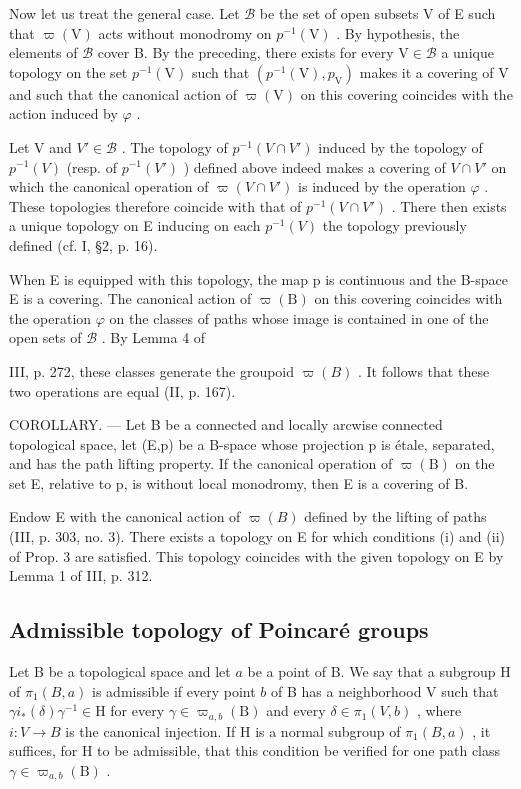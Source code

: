 Now let us treat the general case. Let \(\mathcal{B}\) be the set of open subsets V of E such that \(\varpi(\mathrm{V})\) acts without monodromy on \(p^{-1}(\mathrm{V})\) . By hypothesis, the elements of \(\mathcal{B}\) cover B. By the preceding, there exists for every \(\mathrm{V} \in \mathcal{B}\) a unique topology on the set \(p^{-1}(\mathrm{V})\) such that \((p^{-1}(\mathrm{V}), p_{\mathrm{V}})\) makes it a covering of V and such that the canonical action of \(\varpi(\mathrm{V})\) on this covering coincides with the action induced by \(\varphi\) .

Let V and \(V' \in \mathcal{B}\) . The topology of \(p^{-1}(V \cap V')\) induced by the topology of \(p^{-1}(V)\) (resp. of \(p^{-1}(V')\) ) defined above indeed makes a covering of \(V \cap V'\) on which the canonical operation of \(\varpi(V \cap V')\) is induced by the operation \(\varphi\) . These topologies therefore coincide with that of \(p^{-1}(V \cap V')\) . There then exists a unique topology on E inducing on each \(p^{-1}(V)\) the topology previously defined (cf. I, §2, p. 16).

When E is equipped with this topology, the map p is continuous and the B-space E is a covering. The canonical action of \(\varpi(\mathrm{B})\) on this covering coincides with the operation \(\varphi\) on the classes of paths whose image is contained in one of the open sets of \(\mathcal{B}\) . By Lemma 4 of

III, p. 272, these classes generate the groupoid \(\varpi(B)\) . It follows that these two operations are equal (II, p. 167).

COROLLARY. --- Let B be a connected and locally arcwise connected topological space, let (E,p) be a B-space whose projection p is étale, separated, and has the path lifting property. If the canonical operation of \(\varpi(\mathrm{B})\) on the set E, relative to p, is without local monodromy, then E is a covering of B.

Endow E with the canonical action of \(\varpi(B)\) defined by the lifting of paths (III, p. 303, no. 3). There exists a topology on E for which conditions (i) and (ii) of Prop. 3 are satisfied. This topology coincides with the given topology on E by Lemma 1 of III, p. 312.

\subsection{Admissible topology of Poincaré groups}

Let B be a topological space and let \(a\) be a point of B. We say that a subgroup H of \(\pi_1(B, a)\) is admissible if every point \(b\) of B has a neighborhood V such that \(\gamma i_*(\delta)\gamma^{-1} \in \mathrm{H}\) for every \(\gamma \in \varpi_{a,b}(\mathrm{B})\) and every \(\delta \in \pi_1(V, b)\) , where \(i: V \to B\) is the canonical injection. If H is a normal subgroup of \(\pi_1(B, a)\) , it suffices, for H to be admissible, that this condition be verified for one path class \(\gamma \in \varpi_{a,b}(\mathrm{B})\) .

